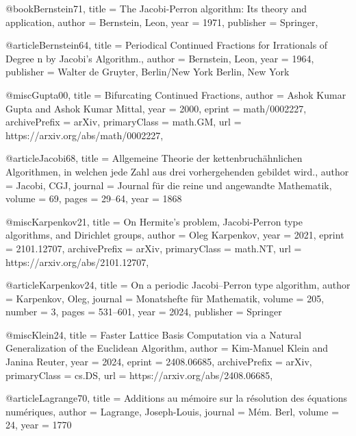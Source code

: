 \documentclass[english,version-2020-11]{uzl-thesis}
\begin{document}








\begin{bibtex-entries}
@book{Bernstein71,
  title     = {The Jacobi-Perron algorithm: Its theory and application},
  author    = {Bernstein, Leon},
  year      = {1971},
  publisher = {Springer},
}

@article{Bernstein64,
  title     = {Periodical Continued Fractions for Irrationals of Degree n by Jacobi's Algorithm.},
  author    = {Bernstein, Leon},
  year      = {1964},
  publisher = {Walter de Gruyter, Berlin/New York Berlin, New York}
}

@misc{Gupta00,
  title         = {Bifurcating Continued Fractions},
  author        = {Ashok Kumar Gupta and Ashok Kumar Mittal},
  year          = {2000},
  eprint        = {math/0002227},
  archivePrefix = {arXiv},
  primaryClass  = {math.GM},
  url           = {https://arxiv.org/abs/math/0002227},
}

@article{Jacobi68,
  title   = {Allgemeine Theorie der kettenbruch{\"a}hnlichen Algorithmen, in welchen jede Zahl aus drei vorhergehenden gebildet wird.},
  author  = {Jacobi, CGJ},
  journal = {Journal f{\"u}r die reine und angewandte Mathematik},
  volume  = {69},
  pages   = {29--64},
  year    = {1868}
}

@misc{Karpenkov21,
  title         = {On Hermite's problem, Jacobi-Perron type algorithms, and Dirichlet groups},
  author        = {Oleg Karpenkov},
  year          = {2021},
  eprint        = {2101.12707},
  archivePrefix = {arXiv},
  primaryClass  = {math.NT},
  url           = {https://arxiv.org/abs/2101.12707},
}

@article{Karpenkov24,
  title     = {On a periodic Jacobi--Perron type algorithm},
  author    = {Karpenkov, Oleg},
  journal   = {Monatshefte f{\"u}r Mathematik},
  volume    = {205},
  number    = {3},
  pages     = {531--601},
  year      = {2024},
  publisher = {Springer}
}

@misc{Klein24,
  title         = {Faster Lattice Basis Computation via a Natural Generalization of the Euclidean Algorithm},
  author        = {Kim-Manuel Klein and Janina Reuter},
  year          = {2024},
  eprint        = {2408.06685},
  archivePrefix = {arXiv},
  primaryClass  = {cs.DS},
  url           = {https://arxiv.org/abs/2408.06685},
}

@article{Lagrange70,
  title   = {Additions au m{\'e}moire sur la r{\'e}solution des {\'e}quations num{\'e}riques},
  author  = {Lagrange, Joseph-Louis},
  journal = {M{\'e}m. Berl},
  volume  = {24},
  year    = {1770}
}


\end{bibtex-entries}
\end{document}
